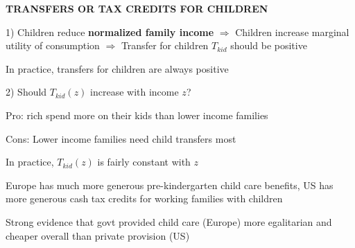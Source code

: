 \documentclass[landscape]{slides}
\begin{document}
\begin{slide}
\begin{center}
{\bf TRANSFERS OR TAX CREDITS FOR CHILDREN}
\end{center}
1) Children reduce {\bf normalized family income} $\Rightarrow$ Children
increase marginal utility of consumption $\Rightarrow$ Transfer
for children $T_{kid}$ should be positive

In practice, transfers for children are always positive

2) Should $T_{kid}(z)$ increase with income $z$?

Pro: rich spend more on their kids than lower income families


Cons: Lower income families need child transfers most

In practice, $T_{kid}(z)$ is fairly constant with $z$

\small
Europe has much more generous pre-kindergarten child care benefits,
US has more generous cash tax credits for working families with children

Strong evidence that govt provided child care (Europe) more egalitarian and cheaper overall than private
provision (US)


\end{slide}
\end{document}

